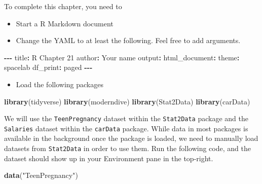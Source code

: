 \documentclass[
]{book}
\makeatletter
\newenvironment{Shaded}{\begin{snugshade}}{\end{snugshade}}
\newcommand{\FunctionTok}[1]{\textcolor[rgb]{0.27,0.27,0.27}{\textbf{#1}}}
\newcommand{\NormalTok}[1]{#1}
\newcommand{\SpecialCharTok}[1]{\textcolor[rgb]{0.43,0.43,0.43}{\textbf{#1}}}
\newcommand{\StringTok}[1]{\textcolor[rgb]{0.5,0.5,0.5}{#1}}
\providecommand{\tightlist}{%
  \setlength{\itemsep}{0pt}\setlength{\parskip}{0pt}}
\newenvironment{kframe}{%
\medskip{}
\setlength{\fboxsep}{.8em}
 \def\at@end@of@kframe{}%
 \ifinner\ifhmode%
  \def\at@end@of@kframe{\end{minipage}}%
  \begin{minipage}{\columnwidth}%
 \fi\fi%
 \def\FrameCommand##1{\hskip\@totalleftmargin \hskip-\fboxsep
 \colorbox{shadecolor}{##1}\hskip-\fboxsep
     \hskip-\linewidth \hskip-\@totalleftmargin \hskip\columnwidth}%
 \MakeFramed {\advance\hsize-\width
   \@totalleftmargin\z@ \linewidth\hsize
   \@setminipage}}%
 {\par\unskip\endMakeFramed%
 \at@end@of@kframe}
\renewenvironment{Shaded}{\begin{kframe}}{\end{kframe}}
\makeatother
\begin{document}
To complete this chapter, you need to

\begin{itemize}
\tightlist
\item
  Start a R Markdown document
\item
  Change the YAML to at least the following. Feel free to add arguments.
\end{itemize}

\begin{Shaded}
\begin{Highlighting}[]
\SpecialCharTok{{-}{-}{-}}
\NormalTok{title}\SpecialCharTok{:} \StringTok{\textquotesingle{}R Chapter 21\textquotesingle{}}
\NormalTok{author}\SpecialCharTok{:} \StringTok{\textquotesingle{}Your name\textquotesingle{}}
\NormalTok{output}\SpecialCharTok{:} 
\NormalTok{  html\_document}\SpecialCharTok{:}
\NormalTok{    theme}\SpecialCharTok{:}\NormalTok{ spacelab}
\NormalTok{    df\_print}\SpecialCharTok{:}\NormalTok{ paged}
\SpecialCharTok{{-}{-}{-}}
\end{Highlighting}
\end{Shaded}

\begin{itemize}
\tightlist
\item
  Load the following packages
\end{itemize}

\begin{Shaded}
\begin{Highlighting}[]
\FunctionTok{library}\NormalTok{(tidyverse)}
\FunctionTok{library}\NormalTok{(moderndive)}
\FunctionTok{library}\NormalTok{(Stat2Data)}
\FunctionTok{library}\NormalTok{(carData)}
\end{Highlighting}
\end{Shaded}

We will use the \texttt{TeenPregnancy} dataset within the \texttt{Stat2Data} package and the \texttt{Salaries} dataset within the \texttt{carData} package. While data in most packages is available in the background once the package is loaded, we need to manually load datasets from \texttt{Stat2Data} in order to use them. Run the following code, and the dataset should show up in your Environment pane in the top-right.

\begin{Shaded}
\begin{Highlighting}[]
\FunctionTok{data}\NormalTok{(}\StringTok{"TeenPregnancy"}\NormalTok{)}
\end{Highlighting}
\end{Shaded}
\end{document}
